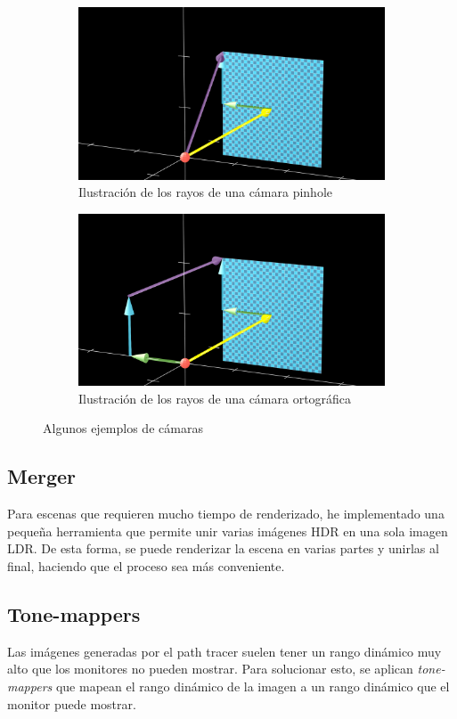 \documentclass{article}
\begin{document}
\begin{figure}[H]
  \begin{subfigure}[h]{0.4\linewidth}
    \includegraphics[width=\linewidth]{imgs/pinhole.png}
    \caption{Ilustración de los rayos de una cámara pinhole}
  \end{subfigure}
  \hfill
  \begin{subfigure}[h]{0.4\linewidth}
    \includegraphics[width=\linewidth]{imgs/ortho.png}
    \caption{Ilustración de los rayos de una cámara ortográfica}
  \end{subfigure}
  \caption{Algunos ejemplos de cámaras}
\end{figure}

\subsection{Merger}
Para escenas que requieren mucho tiempo de renderizado, he implementado una
pequeña herramienta que permite unir varias imágenes HDR en una sola imagen LDR.
De esta forma, se puede renderizar la escena en varias partes y unirlas al
final, haciendo que el proceso sea más conveniente.

\subsection{Tone-mappers}
Las imágenes generadas por el path tracer suelen tener un rango dinámico muy
alto que los monitores no pueden mostrar. Para solucionar esto, se aplican
\textit{tone-mappers} que mapean el rango dinámico de la imagen a un rango
dinámico que el monitor puede mostrar.
\end{document}

